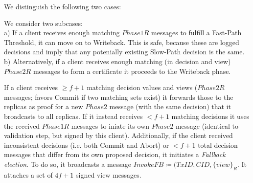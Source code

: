 
We distinguish the following two cases:

We consider two subcases:\\
a) If a client receives enough matching $Phase1R$ messages to fulfill a Fast-Path Threshold, it can move on to Writeback. This is safe, because these are logged decisions and imply that any potenially existing Slow-Path decision is the same.
b) Alternatively, if a client receives enough matching (in decision and view) $Phase2R$ messages to form a certificate it proceeds to the Writeback phase.\\



If a client receives $\geq f+1$ matching decision values and views ($Phase2R$ messages; favors Commit if two matching sets exist) it forwards those to the replicas as proof for a new $Phase2$ message (with the same decision) that it broadcasts to all replicas. If it instead receives $< f+1$ matching decisions it uses the received $Phase1R$ messages to iniate its own $Phase2$ message (identical to validation step, but signed by this client). 
Additionally, if the client received inconsistent decisions (i.e. both Commit and Abort)  or $<f+1$ total decision messages that differ from its own proposed decision, it initiates a \textit{Fallback election}. To do so, it broadcasts a message $InvokeFB \coloneqq (TxID, CID, \{view\}_R$. It attaches a set of $4f+1$ signed view messages.  

